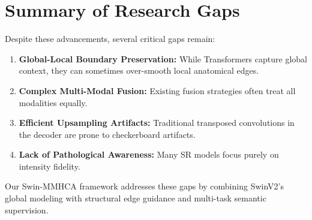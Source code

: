 \section{Summary of Research Gaps}
Despite these advancements, several critical gaps remain:
\begin{enumerate}
    \item \textbf{Global-Local Boundary Preservation:} While Transformers capture global context, they can sometimes over-smooth local anatomical edges.
    \item \textbf{Complex Multi-Modal Fusion:} Existing fusion strategies often treat all modalities equally. 
    \item \textbf{Efficient Upsampling Artifacts:} Traditional transposed convolutions in the decoder are prone to checkerboard artifacts. 
    \item \textbf{Lack of Pathological Awareness:} Many SR models focus purely on intensity fidelity. 
\end{enumerate}

Our Swin-MMHCA framework addresses these gaps by combining SwinV2's global modeling with structural edge guidance and multi-task semantic supervision.
